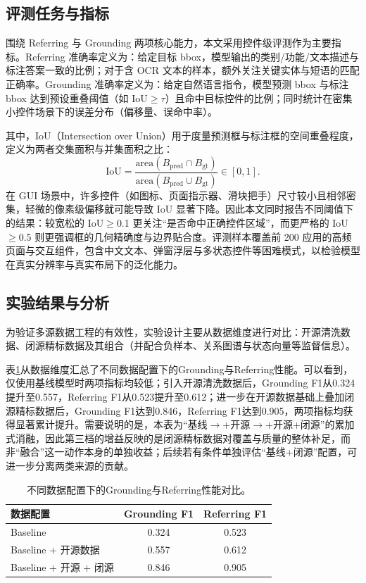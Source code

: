 \subsection{评测任务与指标}
围绕 Referring 与 Grounding 两项核心能力，本文采用控件级评测作为主要指标。Referring 准确率定义为：给定目标 bbox，模型输出的类别/功能/文本描述与标注答案一致的比例；对于含 OCR 文本的样本，额外关注关键实体与短语的匹配正确率。Grounding 准确率定义为：给定自然语言指令，模型预测 bbox 与标注 bbox 达到预设重叠阈值（如 IoU$\ge\tau$）且命中目标控件的比例；同时统计在密集小控件场景下的误差分布（偏移量、误命中率）。

其中，IoU（Intersection over Union）用于度量预测框与标注框的空间重叠程度，定义为两者交集面积与并集面积之比：
\[
\mathrm{IoU}=\frac{\mathrm{area}(B_{\text{pred}}\cap B_{\text{gt}})}{\mathrm{area}(B_{\text{pred}}\cup B_{\text{gt}})}\in[0,1].
\]
在 GUI 场景中，许多控件（如图标、页面指示器、滑块把手）尺寸较小且相邻密集，轻微的像素级偏移就可能导致 IoU 显著下降。因此本文同时报告不同阈值下的结果：较宽松的 IoU$\ge$0.1 更关注“是否命中正确控件区域”，而更严格的 IoU$\ge$0.5 则更强调框的几何精确度与边界贴合度。评测样本覆盖前 200 应用的高频页面与交互组件，包含中文文本、弹窗浮层与多状态控件等困难模式，以检验模型在真实分辨率与真实布局下的泛化能力。

\subsection{实验结果与分析}
为验证多源数据工程的有效性，实验设计主要从数据维度进行对比：开源清洗数据、闭源精标数据及其组合（并配合负样本、关系图谱与状态向量等监督信息）。

表\ref{tab:gui_data_ablation}从数据维度汇总了不同数据配置下的Grounding与Referring性能。可以看到，仅使用基线模型时两项指标均较低；引入开源清洗数据后，Grounding F1从0.324提升至0.557，Referring F1从0.523提升至0.612；进一步在开源数据基础上叠加闭源精标数据后，Grounding F1达到0.846，Referring F1达到0.905，两项指标均获得显著累计提升。需要说明的是，本表为“基线$\rightarrow$+开源$\rightarrow$+开源+闭源”的累加式消融，因此第三档的增益反映的是闭源精标数据对覆盖与质量的整体补足，而非“融合”这一动作本身的单独收益；后续若有条件单独评估“基线+闭源”配置，可进一步分离两类来源的贡献。

\begin{table}[htbp]
\centering
\caption{不同数据配置下的Grounding与Referring性能对比。}
\label{tab:gui_data_ablation}
\small
\renewcommand{\arraystretch}{1.3}
\begin{tabular}{lcc}
\toprule
数据配置 & Grounding F1 & Referring F1 \\
\midrule
Baseline & 0.324 & 0.523 \\
Baseline + 开源数据 & 0.557 & 0.612 \\
Baseline + 开源 + 闭源 & 0.846 & 0.905 \\
\bottomrule
\end{tabular}

\end{table}

